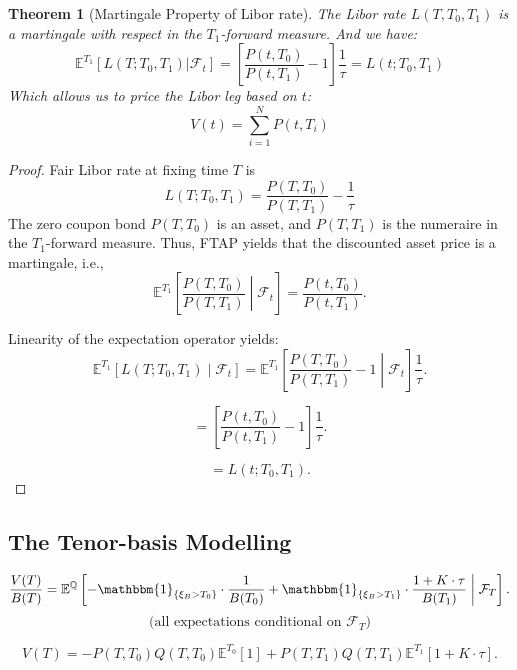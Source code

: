 \documentclass[a4paper,11pt]{book}
\newtheorem{theorem}{Theorem}[section]
\theoremstyle{definition}
\theoremstyle{remark}
\begin{document}
\begin{theorem}[Martingale Property of Libor rate]
	The Libor rate $L(T, T_0, T_1)$ is a martingale with respect in the $T_1$-forward measure. And we have:
	\begin{equation*}
		\mathbb{E}^{T_1} [L(T;T_0, T_1)|\mathcal{F}_t] = \left[\frac{P(t, T_0)}{P(t, T_1)} - 1\right] \frac{1}{\tau} = L(t; T_0, T_1)
	\end{equation*}
	Which allows us to price the Libor leg based on $t$:
	\begin{equation*}
		V(t) = \sum^N_{i = 1} P(t, T_i) 
	\end{equation*}
\end{theorem}
\begin{proof}
Fair Libor rate at fixing time $T$ is
\[
L(T; T_0, T_1) = \frac{P(T, T_0)}{P(T, T_1)} - \frac{1}{\tau}
\]
The zero coupon bond $P(T, T_0)$ is an asset, and $P(T, T_1)$ is the numeraire in the $T_1$-forward measure. Thus, FTAP yields that the discounted asset price is a martingale, i.e.,
\[
\mathbb{E}^{T_1} \left[\frac{P(T, T_0)}{P(T, T_1)} \middle| \mathcal{F}_t \right] = \frac{P(t, T_0)}{P(t, T_1)}.
\]

Linearity of the expectation operator yields:
\[
\mathbb{E}^{T_1} \left[L(T; T_0, T_1) \middle| \mathcal{F}_t \right] = \mathbb{E}^{T_1} \left[\frac{P(T, T_0)}{P(T, T_1)} - 1 \middle| \mathcal{F}_t \right] \frac{1}{\tau}.
\]

\[
= \left[\frac{P(t, T_0)}{P(t, T_1)} - 1\right] \frac{1}{\tau}.
\]

\[
= L(t; T_0, T_1).
\]
\end{proof}




\subsection{The Tenor-basis Modelling}


\[
\frac{V(T)}{B(T)} = \mathbb{E}^{\mathbb{Q}} \left[
-\mathbbm{1}_{\{\xi_B > T_0\}} \cdot \frac{1}{B(T_0)} 
+ \mathbbm{1}_{\{\xi_B > T_1\}} \cdot \frac{1 + K \cdot \tau}{B(T_1)}
\;\middle|\; \mathcal{F}_T \right].
\]
\[
\text{(all expectations conditional on } \mathcal{F}_T \text{)}
\]

\[
V(T) = -P(T, T_0) Q(T, T_0) \mathbb{E}^{T_0}[1] 
+ P(T, T_1) Q(T, T_1) \mathbb{E}^{T_1}[1 + K \cdot \tau].
\]
\end{document}
